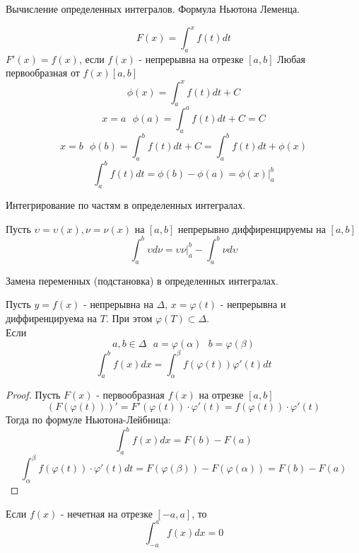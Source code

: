 \begin{title}[\Large]
  Вычисление определенных интегралов. Формула Ньютона Леменца.
\end{title}

\[F(x) = \int^x_a f(t)dt\]
$F'(x) = f(x)$, если $f(x)$ - непрерывна на отрезке $[a, b]$ Любая первообразная
от $f(x) [a, b]$
\[\phi (x) = \int^x_a f(t)dt + C\]
\[x = a ~~~ \phi (a) = \int^a_a f(t)dt + C = C\]
\[x = b ~~~ \phi (b) = \int^b_a f(t)dt + C = \int^b_a f(t)dt + \phi(x)\]
\[\int^b_a f(t)dt = \phi(b) - \phi(a) = \phi(x)|^b_a\]

\begin{title}[\Large]
  Интегрирование по частям в определенных интегралах.
\end{title}

\begin{theorem}
  Пусть $\upsilon = \upsilon (x), \nu = \nu(x)$ на $[a,b]$ непрерывно
  диффиренцируемы на $[a,b]$
  \[
    \int_a^b \upsilon d\nu = \upsilon \nu |_a^b - \int_a^b \nu d\upsilon
  \]
\end{theorem}

\begin{title}[\Large]
  Замена переменных (подстановка) в определенных интегралах.
\end{title}

\begin{theorem}
  Пусть $y = f(x)$ - непрерывна на $\Delta$, $x = \varphi (t)$ - непрерывна и
  диффиренцируема на $T$. При этом $\varphi (T) \subset \Delta$.\\
  Если
  \[a, b \in \Delta ~~~ a = \varphi (\alpha) ~~~ b = \varphi (\beta)\]
  \[\int^b_a f(x)dx = \int^{\beta}_{\alpha} f(\varphi (t)) \varphi' (t)dt\]
\end{theorem}

\begin{proof}
  Пусть $F(x)$ - первообразная $f(x)$ на отрезке $[a, b]$\\
  \[
    (F(\varphi (t)))' = F'(\varphi (t)) \cdot \varphi' (t) = f(\varphi(t))
    \cdot \varphi'(t)
  \]
  Тогда по формуле Ньютона-Лейбница:
  \[\int^b_a f(x)dx = F(b) - F(a)\]
  \[
    \int^{\beta}_{\alpha} f(\varphi (t)) \cdot \varphi' (t)dt =
    F(\varphi (\beta)) - F(\varphi (\alpha)) = F(b) - F(a)
  \]
\end{proof}

\begin{theorem}
  Если $f(x)$ - нечетная на отрезке $[-a, a]$, то
  \[\int^a_{-a} f(x)dx = 0\]
\end{theorem}

